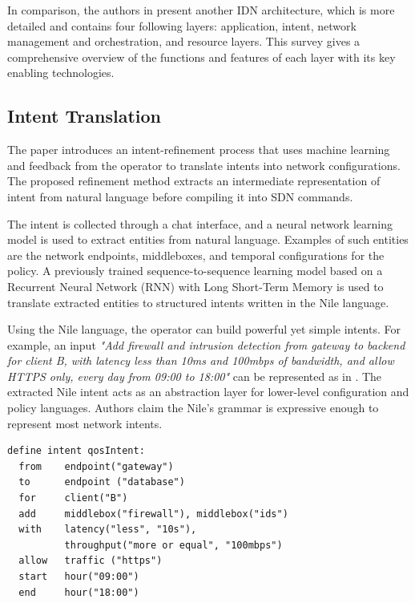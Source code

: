 In comparison, the authors in \cite[13]{Mehmood2021} present another IDN architecture, which is more detailed and contains four following layers: application, intent, network management and orchestration, and resource layers. This survey gives a comprehensive overview of the functions and features of each layer with its key enabling technologies.


\subsection{Intent Translation}

The paper \cite{Jacobs2018} introduces an intent-refinement process that uses machine learning and feedback from the operator to translate intents into network configurations. The proposed refinement method extracts an intermediate representation of intent from natural language before compiling it into SDN commands.

The intent is collected through a chat interface, and a neural network learning model is used to extract entities from natural language. Examples of such entities are the network endpoints, middleboxes, and temporal configurations for the policy. A previously trained sequence-to-sequence learning model based on a Recurrent Neural Network (RNN) with Long Short-Term Memory is used to translate extracted entities to structured intents written in the Nile language. 

Using the Nile language, the operator can build powerful yet simple intents. For example, an input \textit{"Add firewall and intrusion detection from gateway to backend for client B, with latency less than 10ms and 100mbps of bandwidth, and allow HTTPS only, every day from 09:00 to 18:00"} can be represented as in . The extracted Nile intent acts as an abstraction layer for lower-level configuration and policy languages. Authors claim the Nile's grammar is expressive enough to represent most network intents.


\begin{lstlisting}[language=Nile,float=ht,caption={Nile intent example\cite{Jacobs2018}},label=lst:nile_intent_example]
define intent qosIntent:
  from    endpoint("gateway")
  to      endpoint ("database")
  for     client("B")
  add     middlebox("firewall"), middlebox("ids")
  with    latency("less", "10s"),
          throughput("more or equal", "100mbps")
  allow   traffic ("https")
  start   hour("09:00")
  end     hour("18:00")
\end{lstlisting}

